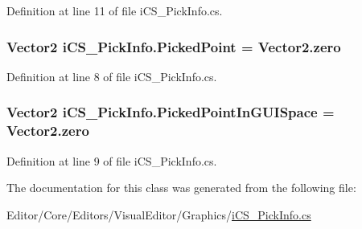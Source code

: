 Definition at line 11 of file i\+C\+S\+\_\+\+Pick\+Info.\+cs.

\hypertarget{classi_c_s___pick_info_ab61b40c3301d0e8887507fc9009dd866}{
\subsubsection[{Picked\+Point}]{\setlength{\rightskip}{0pt plus 5cm}Vector2 i\+C\+S\+\_\+\+Pick\+Info.\+Picked\+Point = Vector2.\+zero}}\label{classi_c_s___pick_info_ab61b40c3301d0e8887507fc9009dd866}


Definition at line 8 of file i\+C\+S\+\_\+\+Pick\+Info.\+cs.

\hypertarget{classi_c_s___pick_info_a0ab5802ece1dafab0eadc9405c40f653}{
\subsubsection[{Picked\+Point\+In\+G\+U\+I\+Space}]{\setlength{\rightskip}{0pt plus 5cm}Vector2 i\+C\+S\+\_\+\+Pick\+Info.\+Picked\+Point\+In\+G\+U\+I\+Space = Vector2.\+zero}}\label{classi_c_s___pick_info_a0ab5802ece1dafab0eadc9405c40f653}


Definition at line 9 of file i\+C\+S\+\_\+\+Pick\+Info.\+cs.



The documentation for this class was generated from the following file\+:\begin{DoxyCompactItemize}
\item 
Editor/\+Core/\+Editors/\+Visual\+Editor/\+Graphics/\hyperlink{i_c_s___pick_info_8cs}{i\+C\+S\+\_\+\+Pick\+Info.\+cs}\end{DoxyCompactItemize}

